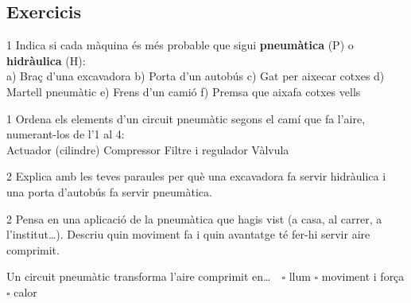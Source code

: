 \subsection*{Exercicis}

\begin{exercici}{1}
Indica si cada màquina és més probable que sigui \textbf{pneumàtica} (P) o \textbf{hidràulica} (H):\\[0.3em]
a) Braç d'una excavadora \quad b) Porta d'un autobús \quad c) Gat per aixecar cotxes \quad d) Martell pneumàtic \quad e) Frens d'un camió \quad f) Premsa que aixafa cotxes vells
\end{exercici}

\begin{exercici}{1}
Ordena els elements d'un circuit pneumàtic segons el camí que fa l'aire, numerant-los de l'1 al 4:\\
\underline{\hspace{0.6cm}} Actuador (cilindre) \quad \underline{\hspace{0.6cm}} Compressor \quad \underline{\hspace{0.6cm}} Filtre i regulador \quad \underline{\hspace{0.6cm}} Vàlvula
\end{exercici}

\begin{exercici}{2}
Explica amb les teves paraules per què una excavadora fa servir hidràulica i una porta d'autobús fa servir pneumàtica.
\end{exercici}

\begin{exercici}{2}
Pensa en una aplicació de la pneumàtica que hagis vist (a casa, al carrer, a l'institut\ldots). Descriu quin moviment fa i quin avantatge té fer-hi servir aire comprimit.
\end{exercici}

\begin{comprova}
Un circuit pneumàtic transforma l'aire comprimit en\ldots\ \ $\square$ llum \quad $\square$ moviment i força \quad $\square$ calor
\end{comprova}
